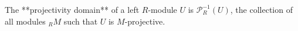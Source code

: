 The **projectivity domain** of a left $R$-module $U$ is $\mathcal{P}_R^{-1}(U)$, the collection of all modules ${}_R M$ such that $U$ is $M$-projective.
